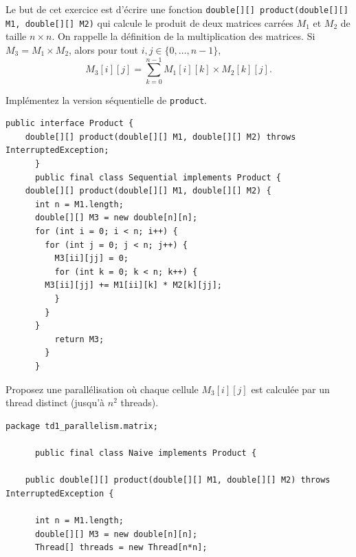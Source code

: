 
\begingroup

\begin{exercice}[Parallélisation]
  \label{exo:introduction/matrix}

  Le but de cet exercice est d'écrire une fonction \lstinline{double[][] product(double[][] M1, double[][] M2)}
  qui calcule le produit de deux matrices carrées $M_1$ et $M_2$ de taille $n\times n$.
  On rappelle la définition de la multiplication des matrices. Si $M_3 = M_1 \times M_2$, alors pour tout
  $i,j \in \{0,\dots,n-1\}$,
  $$ M_3[i][j] = \sum_{k=0}^{n-1} M_1[i][k] \times M_2[k][j].$$

  \begin{question}
  \item Implémentez la version séquentielle de \lstinline{product}.
  \end{question}
  \begin{correction}
    \begin{lstlisting}[gobble=6]
      public interface Product {
	double[][] product(double[][] M1, double[][] M2) throws InterruptedException;
      }
      public final class Sequential implements Product {
	double[][] product(double[][] M1, double[][] M2) {
	  int n = M1.length;
	  double[][] M3 = new double[n][n];
	  for (int i = 0; i < n; i++) {
	    for (int j = 0; j < n; j++) {
	      M3[ii][jj] = 0;
	      for (int k = 0; k < n; k++) {
		M3[ii][jj] += M1[ii][k] * M2[k][jj];
	      }
	    }
	  }
          return M3;
        }
      }
    \end{lstlisting}
  \end{correction}

  \begin{question}
  \item Proposez une parallélisation où chaque cellule $M_3[i][j]$ est calculée par un thread distinct (jusqu'à $n^2$ threads). 
  \end{question}
  \begin{correction}
    \begin{lstlisting}[gobble=6]
      package td1_parallelism.matrix;

      public final class Naive implements Product {

	public double[][] product(double[][] M1, double[][] M2) throws InterruptedException {

	  int n = M1.length;
	  double[][] M3 = new double[n][n];
	  Thread[] threads = new Thread[n*n];


\end{lstlisting}
\end{correction}
\end{exercice}
